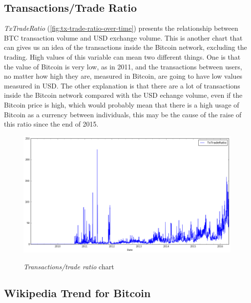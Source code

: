 
\subsection{Transactions/Trade Ratio}
\label{sec:tx-trade-ratio}

\textit{TxTradeRatio} (\autoref{fig:tx-trade-ratio-over-time})
presents the relationship between BTC transaction volume and USD
exchange volume. This is another chart that can gives us an idea of
the transactions inside the Bitcoin network, excluding the trading.
High values of this variable can mean two different things. One is
that the value of Bitcoin is very low, as in 2011, and the
transactions between users, no matter how high they are, measured in
Bitcoin, are going to have low values measured in USD. The other
explanation is that there are a lot of transactions inside the Bitcoin
network compared with the USD echange volume, even if the Bitcoin
price is high, which would probably mean that there is a high usage of
Bitcoin as a currency between individuals, this may be the cause of
the raise of this ratio since the end of 2015.

\begin{figure}[bth]
  \myfloatalign
  {\includegraphics[width=1\linewidth]
    {gfx/tx-trade-ratio-over-time}}
  \caption{\textit{Transactions/trade ratio} chart}
  \label{fig:tx-trade-ratio-over-time}
\end{figure}


\subsection{Wikipedia Trend for Bitcoin}
\label{sec:wikipedia-trend-for-bitcoin}



